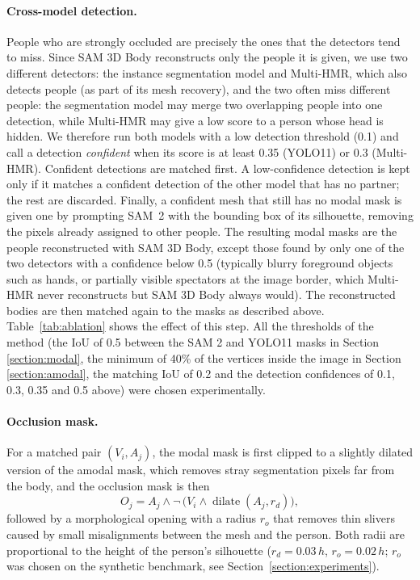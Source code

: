 \documentclass[pdflatex,sn-mathphys-num]{sn-jnl}%
\begin{document}
\paragraph{Cross-model detection.}
People who are strongly occluded are precisely the ones that the detectors tend to miss. Since SAM 3D Body reconstructs only the people it is given, we use two different detectors: the instance segmentation model and Multi-HMR, which also detects people (as part of its mesh recovery), and the two often miss different people: the segmentation model may merge two overlapping people into one detection, while Multi-HMR may give a low score to a person whose head is hidden. We therefore run both models with a low detection threshold (0.1) and call a detection \emph{confident} when its score is at least 0.35 (YOLO11) or 0.3 (Multi-HMR). Confident detections are matched first. A low-confidence detection is kept only if it matches a confident detection of the other model that has no partner; the rest are discarded. Finally, a confident mesh that still has no modal mask is given one by prompting SAM~2 with the bounding box of its silhouette, removing the pixels already assigned to other people. The resulting modal masks are the people reconstructed with SAM 3D Body, except those found by only one of the two detectors with a confidence below 0.5 (typically blurry foreground objects such as hands, or partially visible spectators at the image border, which Multi-HMR never reconstructs but SAM 3D Body always would). The reconstructed bodies are then matched again to the masks as described above. Table~\ref{tab:ablation} shows the effect of this step. All the thresholds of the method (the IoU of 0.5 between the SAM 2 and YOLO11 masks in Section \ref{section:modal}, the minimum of 40\% of the vertices inside the image in Section \ref{section:amodal}, the matching IoU of 0.2 and the detection confidences of 0.1, 0.3, 0.35 and 0.5 above) were chosen experimentally.

\paragraph{Occlusion mask.}
For a matched pair $(V_i, A_j)$, the modal mask is first clipped to a slightly dilated version of the amodal mask, which removes stray segmentation pixels far from the body, and the occlusion mask is then
\begin{equation}
O_j = A_j \land \lnot\, \big(V_i \land \operatorname{dilate}(A_j, r_d)\big),
\end{equation}
followed by a morphological opening with a radius $r_o$ that removes thin slivers caused by small misalignments between the mesh and the person. Both radii are proportional to the height of the person's silhouette ($r_d = 0.03\,h$, $r_o = 0.02\,h$; $r_o$ was chosen on the synthetic benchmark, see Section~\ref{section:experiments}).
\end{document}
